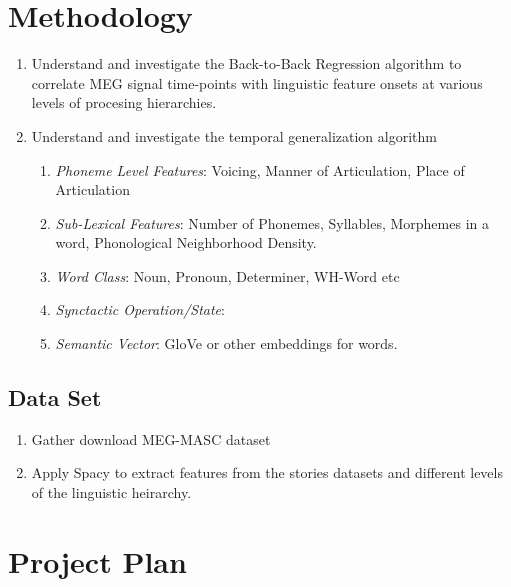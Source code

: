 \documentclass{tufte-handout}
\begin{document}
\section{Methodology}


\begin{enumerate}
    \item Understand and investigate the Back-to-Back Regression algorithm \citep{King2020.03.05.976936} to correlate MEG signal time-points with linguistic feature onsets at various levels of procesing hierarchies. 
    \item Understand and investigate the temporal generalization algorithm \citep{KING2014203}
    \begin{enumerate}
        \item \emph{Phoneme Level Features}: Voicing, Manner of Articulation, Place of Articulation 
        \item \emph{Sub-Lexical Features}:
        Number of Phonemes, Syllables, Morphemes in a word, Phonological Neighborhood Density.
        \item  \emph{Word Class}:
        Noun, Pronoun, Determiner, WH-Word etc
        \item \emph{Synctactic Operation/State}: 
        \item \emph{Semantic Vector}: GloVe\cite{pennington-etal-2014-glove} or other embeddings for words.
        
    \end{enumerate}
    
\end{enumerate}


\subsection{Data Set}

\begin{enumerate}
    \item Gather download MEG-MASC \cite{gwilliams2022megmaschighqualitymagnetoencephalographydataset} dataset
    \item Apply Spacy\cite{Honnibal_spaCy_Industrial} to extract features from the stories datasets and different levels of the linguistic heirarchy.
\end{enumerate}

\section{Project Plan}
\end{document}
